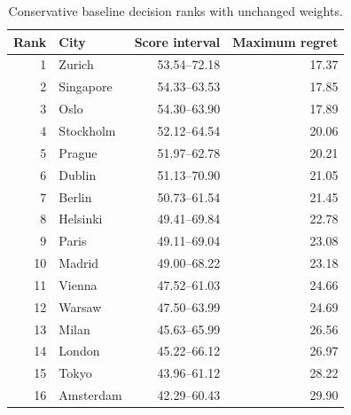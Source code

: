 \begin{table}[!ht]\centering
\caption{Conservative baseline decision ranks with unchanged weights.}\label{tab:baseline}
\begin{tabular}{rlrr}\toprule
Rank & City & Score interval & Maximum regret\\\midrule
1 & Zurich & 53.54--72.18 & 17.37 \\
2 & Singapore & 54.33--63.53 & 17.85 \\
3 & Oslo & 54.30--63.90 & 17.89 \\
4 & Stockholm & 52.12--64.54 & 20.06 \\
5 & Prague & 51.97--62.78 & 20.21 \\
6 & Dublin & 51.13--70.90 & 21.05 \\
7 & Berlin & 50.73--61.54 & 21.45 \\
8 & Helsinki & 49.41--69.84 & 22.78 \\
9 & Paris & 49.11--69.04 & 23.08 \\
10 & Madrid & 49.00--68.22 & 23.18 \\
11 & Vienna & 47.52--61.03 & 24.66 \\
12 & Warsaw & 47.50--63.99 & 24.69 \\
13 & Milan & 45.63--65.99 & 26.56 \\
14 & London & 45.22--66.12 & 26.97 \\
15 & Tokyo & 43.96--61.12 & 28.22 \\
16 & Amsterdam & 42.29--60.43 & 29.90 \\
\bottomrule\end{tabular}\end{table}
